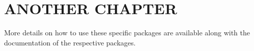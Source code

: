 \chapter{ANOTHER CHAPTER}
\label{chap:2ndchap}

More details on how to use these specific packages are available along
with the documentation of the respective packages.